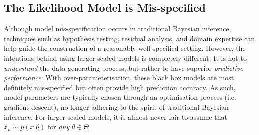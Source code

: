 \documentclass[twoside,11pt]{article}
\begin{document}
\subsection{The Likelihood Model is Mis-specified}
Although model mis-specification occurs in traditional Bayesian inference, techniques such as hypothesis testing, residual analysis, and domain expertise can help guide the construction of a reasonably well-specified setting. However, the intentions behind using larger-scaled models is completely different. It is not to \textit{understand} the data generating process, but rather to have superior \textit{predictive performance}. With over-parameterisation, these black box models are most definitely mis-specified but often provide high prediction accuracy. As such, model parameters are typically chosen through an optimisation process (i.e. gradient descent), no longer adhering to the spirit of traditional Bayesian inference. For larger-scaled models, it is almost never fair to assume that $x_n \sim p(x|\theta)$ for \textit{any} $\theta \in \Theta$.
\end{document}
